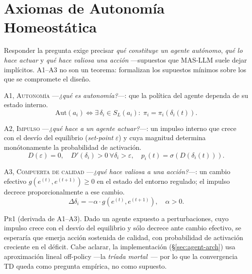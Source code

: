 \documentclass{llncs}
\begin{document}
\section{Axiomas de Autonom\'ia Homeost\'atica}
\label{sec:tah}

Responder la pregunta exige precisar \emph{qu\'e constituye un
agente aut\'onomo}, \emph{qu\'e lo hace actuar} y \emph{qu\'e hace
valiosa una acci\'on} ---supuestos que MAS-LLM suele dejar
impl\'icitos. A1--A3 no son un teorema: formalizan los supuestos
m\'inimos sobre los que se compromete el dise\~no.

\textsc{A1, Autonom\'ia}
---\emph{¿qu\'e es autonom\'ia?}---: que la pol\'itica del agente
dependa de su estado interno.
\vspace{-0.6em}
\begin{equation}
\mathrm{Aut}(a_i) \iff \exists\,\delta_i \in S_L(a_i):\;
\pi_i = \pi_i\!\left(\delta_i(t)\right). \label{eq:a1}
\end{equation}
\vspace{-1.4em}

\textsc{A2, Impulso}
---\emph{¿qu\'e hace a un agente actuar?}---: un impulso interno que
crece con el desv\'io del equilibrio (\emph{set-point} $\varepsilon$)
y cuya magnitud determina mon\'otonamente la probabilidad de
activaci\'on.
\vspace{-0.6em}
\begin{equation}
D(\varepsilon){=}0,\quad D'(\delta_i){>}0\ \forall\delta_i{>}\varepsilon,\quad
p_i(t) = \sigma\!\left(D(\delta_i(t))\right). \label{eq:a2}
\end{equation}
\vspace{-1.4em}

\textsc{A3, Compuerta de calidad}
---\emph{¿qu\'e hace valiosa a una acci\'on?}---: un cambio efectivo
$g(e^{(t)},e^{(t+1)}){\ge}0$ en el estado del entorno regulado; el
impulso decrece proporcionalmente a ese cambio.
\vspace{-0.6em}
\begin{equation}
\Delta\delta_i = -\alpha\cdot g\!\left(e^{(t)},e^{(t+1)}\right),\quad
\alpha{>}0. \label{eq:a3}
\end{equation}
\vspace{-1.4em}

\textsc{Pr1} (derivada de A1--A3). Dado un agente expuesto a
perturbaciones, cuyo impulso crece con el desv\'io del equilibrio y
s\'olo decrece ante cambio efectivo, se esperar\'ia que emerja
acci\'on sostenida de calidad, con probabilidad de activaci\'on
creciente en el d\'eficit. Cabe aclarar, la implementaci\'on
(\S\ref{sec:agent-arch}) usa aproximaci\'on lineal off-policy ---la
\emph{tr\'iada mortal}~\parencite{sutton2018reinforcement}--- por lo
que la convergencia TD queda como pregunta emp\'irica, no como
supuesto.
\end{document}
